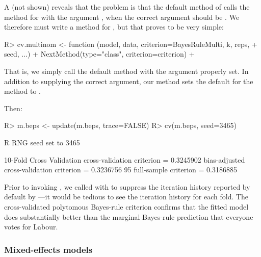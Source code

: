 \documentclass[
]{jss}
\begin{document}
A  (not shown) reveals that the problem is that the
default method of  calls the  method for
 with the argument , when the
correct argument should be . We therefore must write
a  method for , but that proves to be very
simple:

\begin{CodeChunk}
\begin{CodeInput}
R> cv.multinom <- function (model, data, criterion=BayesRuleMulti, k, reps,
+                          seed, ...){
+   NextMethod(type="class", criterion=criterion)
+ }
\end{CodeInput}
\end{CodeChunk}

That is, we simply call the default  method with the
 argument properly set. In addition to supplying the correct
 argument, our method sets the default  for
the  method to .

Then:

\begin{CodeChunk}
\begin{CodeInput}
R> m.beps <- update(m.beps, trace=FALSE)
R> cv(m.beps, seed=3465)
\end{CodeInput}
\begin{CodeOutput}
R RNG seed set to 3465
\end{CodeOutput}
\begin{CodeOutput}
10-Fold Cross Validation
cross-validation criterion = 0.3245902
bias-adjusted cross-validation criterion = 0.3236756
95%
full-sample criterion = 0.3186885 
\end{CodeOutput}
\end{CodeChunk}

Prior to invoking , we called  with
 to suppress the iteration history reported by default
by ---it would be tedious to see the iteration history
for each fold. The cross-validated polytomous Bayes-rule criterion
confirms that the fitted model does substantially better than the
marginal Bayes-rule prediction that everyone votes for Labour.

\hypertarget{mixed-effects-models}{%
\subsubsection{Mixed-effects models}\label{mixed-effects-models}}
\end{document}
